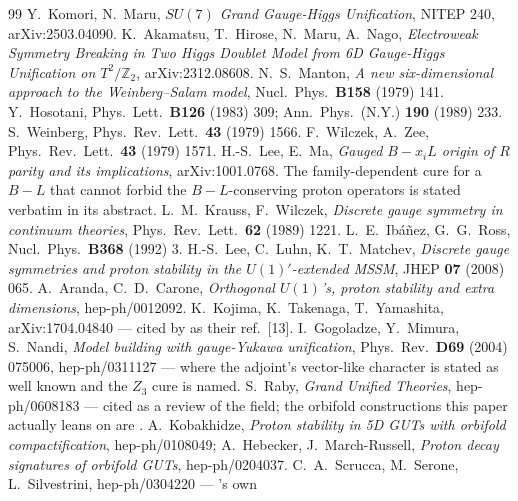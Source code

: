 \documentclass[11pt,a4paper]{article}
\newcommand{\ZZ}{\mathbb{Z}}
\begin{document}
\begin{thebibliography}{99}\small
\setlength{\itemsep}{0pt plus 1pt}
 Y.~Komori, N.~Maru, \emph{$SU(7)$ Grand Gauge-Higgs Unification}, NITEP 240,
arXiv:2503.04090.
 K.~Akamatsu, T.~Hirose, N.~Maru, A.~Nago, \emph{Electroweak Symmetry Breaking in Two
Higgs Doublet Model from 6D Gauge-Higgs Unification on $T^2/\ZZ_2$}, arXiv:2312.08608.
 N.~S.~Manton, \emph{A new six-dimensional approach to the Weinberg--Salam model},
Nucl.\ Phys.\ \textbf{B158} (1979) 141.
 Y.~Hosotani, Phys.\ Lett.\ \textbf{B126} (1983) 309; Ann.\ Phys.\ (N.Y.)
\textbf{190} (1989) 233.
 S.~Weinberg, Phys.\ Rev.\ Lett.\ \textbf{43} (1979) 1566.
 F.~Wilczek, A.~Zee, Phys.\ Rev.\ Lett.\ \textbf{43} (1979) 1571.
 H.-S.~Lee, E.~Ma, \emph{Gauged $B-x_iL$ origin of $R$ parity and its
implications}, arXiv:1001.0768. The family-dependent cure for a $B-L$ that cannot forbid the
$B-L$-conserving proton operators is stated verbatim in its abstract.
 L.~M.~Krauss, F.~Wilczek, \emph{Discrete gauge symmetry in continuum theories}, Phys.\
Rev.\ Lett.\ \textbf{62} (1989) 1221.
 L.~E.~Ib\'a\~nez, G.~G.~Ross, Nucl.\ Phys.\ \textbf{B368} (1992) 3.
\bibitem{DiscGauge} H.-S.~Lee, C.~Luhn, K.~T.~Matchev, \emph{Discrete gauge symmetries and proton
stability in the $U(1)'$-extended
MSSM}, JHEP \textbf{07} (2008) 065.
 A.~Aranda, C.~D.~Carone, \emph{Orthogonal $U(1)$'s, proton stability and extra
dimensions}, hep-ph/0012092.
 K.~Kojima, K.~Takenaga, T.~Yamashita, arXiv:1704.04840 --- cited by \cite{KM25} as
their ref.~[13].
 I.~Gogoladze, Y.~Mimura, S.~Nandi, \emph{Model building with gauge-Yukawa
unification}, Phys.\ Rev.\ \textbf{D69} (2004) 075006, hep-ph/0311127 --- where the adjoint's
vector-like character is stated as well known and the $Z_3$ cure is named.
\bibitem{Raby} S.~Raby, \emph{Grand Unified Theories}, hep-ph/0608183 --- cited as a review of the
field; the orbifold constructions this paper actually leans on are \cite{OrbGUT}.
\bibitem{OrbGUT} A.~Kobakhidze, \emph{Proton stability in 5D GUTs with orbifold compactification},
hep-ph/0108049; A.~Hebecker, J.~March-Russell, \emph{Proton decay signatures of orbifold GUTs},
hep-ph/0204037.
 C.~A.~Scrucca, M.~Serone, L.~Silvestrini, hep-ph/0304220 --- \cite{AHMN}'s own

\end{thebibliography}
\end{document}
